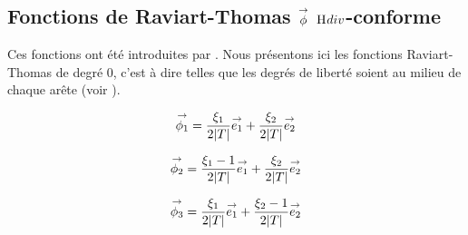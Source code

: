   \subsection[Fonctions de Raviart-Thomas phi Hdiv-conforme]{Fonctions de Raviart-Thomas \(\vect{\phi}\) \(\Hdiv\)-conforme}

    Ces fonctions ont été introduites par \cite{raviart_mixed_1977}. Nous présentons ici les fonctions Raviart-Thomas de degré 0, c'est à dire telles que les degrés de liberté soient au milieu de chaque arête (voir \cite[eq.~(3.10)]{raviart_mixed_1977}).

    \begin{minipage}{\textwidth}
      \begin{minipage}{0.329\textwidth}
          \begin{center}
            \begin{tikzpicture}[scale=1]
              
            \end{tikzpicture}
          \end{center}
          \begin{equation*}
            \vect{\phi_1}=\frac{\xi_1}{2|T|}\vect{e_1} + \frac{\xi_2}{{2|T|}}\vect{e_2}
          \end{equation*}
      \end{minipage}
      \begin{minipage}{0.329\textwidth}
          \begin{center}
            \begin{tikzpicture}[scale=1]
              
            \end{tikzpicture}
             \begin{equation*}
              \vect{\phi_2}=\frac{\xi_1-1}{2|T|}\vect{e_1} + \frac{\xi_2}{2|T|}\vect{e_2}
            \end{equation*}
          \end{center}
      \end{minipage}
      \begin{minipage}{0.329\textwidth}
          \begin{center}
            \begin{tikzpicture}[scale=1]
              
            \end{tikzpicture}
            \begin{equation*}
              \vect{\phi_3}=\frac{\xi_1}{2|T|}\vect{e_1} + \frac{\xi_2-1}{2|T|}\vect{e_2}
            \end{equation*}
          \end{center}
      \end{minipage}
      \label{fig:form_int:fon_base:phi}
    \end{minipage}

